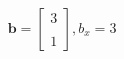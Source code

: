 \documentclass[preview]{standalone}
\begin{document}
\begin{align*}
\mathbf{b} = \begin{bmatrix}3 \\ \\ 1 \end{bmatrix}, b_x=3
\end{align*}
\end{document}

